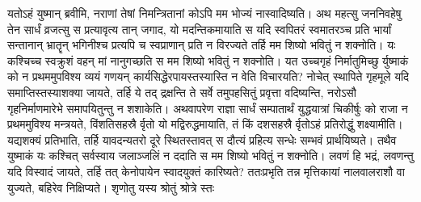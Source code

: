 \vakya यतोऽहं युष्मान् ब्रवीमि, नराणां तेषां निमन्त्रितानां कोऽपि मम भोज्यं नास्वादिष्यति।
\vakya अथ महत्सु जननिवहेषु तेन सार्धं व्रजत्सु स प्रत्यावृत्य तान् जगाद,
\vakya यो मदन्तिकमायाति स यदि स्वपितरं स्वमातरञ्च प्रति भार्यां सन्तानान् भ्रातॄन् भगिनीश्च प्रत्यपि च स्वप्राणान् प्रति न विरज्यते तर्हि मम शिष्यो भवितुं न शक्नोति।
\vakya यः कश्चिच्च स्वक्रुशं वहन् मां नानुगच्छति स मम शिष्यो भवितुं न शक्नोति।
\vakya यत उच्चगृहं निर्मातुमिच्छु र्युष्माकं को न प्रथममुपविश्य व्ययं गणयन् कार्यसिद्धेरपायस्तस्यास्ति न वेति विचारयति?
\vakya नोचेत् स्थापिते गृहमूले यदि समाप्तिस्तस्याशक्या जायते, तर्हि ये तद् द्रक्षन्ति ते सर्वे तमुपहसितुं प्रवृत्ता वदिष्यन्ति,
\vakya नरोऽसौ गृहनिर्माणमारेभे समापयितुन्तु न शशाकेति।
\vakya अथवापरेण राज्ञा सार्धं सम्पातार्थं युद्धयात्रां चिकीर्षुः को राजा न प्रथममुविश्य मन्त्रयते, विंशतिसहस्रै र्वृतो यो मद्विरुद्धमायाति, तं किं दशसहस्रै र्वृतोऽहं प्रतिरोद्धुं शक्ष्यामीति।
\vakya यद्यशक्यं प्रतिभाति, तर्हि यावदन्यतरो दूरे स्थितस्तावत् स दौत्यं प्रहित्य सन्धेः सम्भवं प्रार्थयिष्यते।
\vakya तथैव युष्माकं यः कश्चित् सर्वस्वाय जलाञ्जलिं न ददाति स मम शिष्यो भवितुं न शक्नोति।
\vakya लवणं हि भद्रं, लवणन्तु यदि विस्वादं जायते, तर्हि तत् केनोपायेन स्वादयुक्तं कारिष्यते?
\vakya ततःप्रभृति तन्न मृत्तिकायां नालवालराशौ वा युज्यते, बहिरेव निक्षिप्यते। शृणोतु यस्य श्रोतुं श्रोत्रे स्तः\eoc
